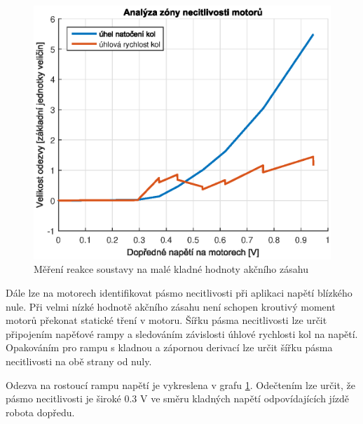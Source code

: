 \documentclass[conference]{IEEEtran}
\begin{document}
\begin{figure}[htbp]
    \centerline{\includegraphics[width=\linewidth]{deadzone_motory_vpred.eps}}
    \caption{Měření reakce soustavy na malé kladné hodnoty akčního zásahu}
    \label{fig:deadzone_vpred}        
\end{figure}

Dále lze na motorech identifikovat pásmo necitlivosti při aplikaci napětí blízkého nule. Při velmi nízké hodnotě
akčního zásahu není schopen kroutivý moment motorů překonat statické tření v motoru.
Šířku pásma necitlivosti lze určit připojením napěťové rampy a sledováním závislosti úhlové rychlosti kol na napětí.
Opakováním pro rampu s kladnou a zápornou derivací lze určit šířku pásma necitlivosti na obě strany od nuly.

Odezva na rostoucí rampu napětí je vykreslena v grafu \ref{fig:deadzone_vpred}. Odečtením lze určit,
že pásmo necitlivosti je široké 0.3 \si{V} ve směru kladných napětí odpovídajících jízdě robota dopředu. 
\end{document}
